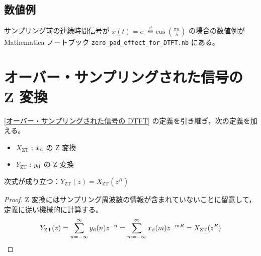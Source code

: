         \subsection{数値例}
            サンプリング前の連続時間信号が $x(t) = e^{-\frac{n^2}{800}}\cos\left(\frac{\pi n}{5}\right)$ の場合の数値例が Mathematica ノートブック \verb|zero_pad_effect_for_DTFT.nb| にある。
    \section{オーバー・サンプリングされた信号の Z 変換}
        \newcommand*{\XZT}{X_\text{ZT}}
        \newcommand*{\YZT}{Y_\text{ZT}}
        \ref{オーバー・サンプリングされた信号の DTFT} の定義を引き継ぎ，次の定義を加える。
        \begin{itemize}
            \item $\XZT$ : $x_\text{d}$ の Z 変換
            \item $\YZT$ : $y_\text{d}$ の Z 変換
        \end{itemize}
        \begin{shadebox}
            次式が成り立つ：$\YZT(z) = \XZT(z^R)$
        \end{shadebox}
        \begin{proof}
            Z 変換にはサンプリング周波数の情報が含まれていないことに留意して，定義に従い機械的に計算する。
            \[ \YZT(z) = \sum_{n=-\infty}^\infty \yd(n)z^{-n} = \sum_{m=-\infty}^\infty \xd(m)z^{-mR} = \XZT(z^R) \]
        \end{proof}
